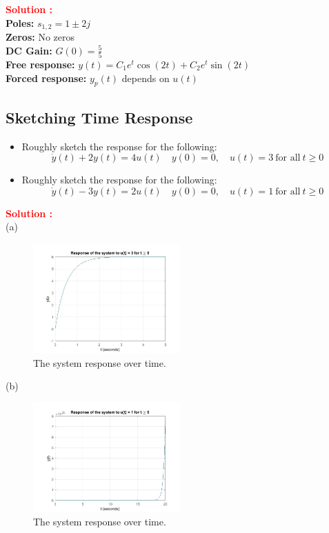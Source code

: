 \documentclass[12pt]{article}
\begin{document}
\textbf{\textcolor{red}{Solution :}} \\
\textbf{Poles:} \(s_{1,2} = 1 \pm 2j\) \\
\textbf{Zeros:} No zeros \\
\textbf{DC Gain:} \(G(0) = \frac{5}{5}\) \\
\textbf{Free response:} \(y(t) = C_1 e^{t} \cos(2t) + C_2 e^{t} \sin(2t)\) \\
\textbf{Forced response:} \(y_p(t)\) depends on \(u(t)\) \\

\clearpage
\subsection{Sketching Time Response}

\begin{itemize}
    \item[(a)] Roughly sketch the response for the following:
    \begin{equation}
        \dot{y}(t) + 2 y(t) = 4 u(t) \quad y(0) = 0, \quad u(t) = 3 \ \text{for all} \ t \geq 0
    \end{equation}
    \item[(b)] Roughly sketch the response for the following:
        \begin{equation}
        \dot{y}(t) - 3 y(t) = 2 u(t) \quad y(0) = 0, \quad u(t) = 1 \ \text{for all} \ t \geq 0
    \end{equation}

\end{itemize}
\textbf{\textcolor{red}{Solution :}} \\
(a)
    \begin{figure}[H]
    \centering
    \includegraphics[width=0.5\textwidth]{figs/3.12-1.jpg}
    \caption{The system response over time.}
    \label{fig:yb}
\end{figure}
(b)
\begin{figure}[H]
    \centering
    \includegraphics[width=0.5\textwidth]{figs/3.12-2.jpg}
    \caption{The system response over time.}
    \label{fig:yb}
\end{figure}
\end{document}
